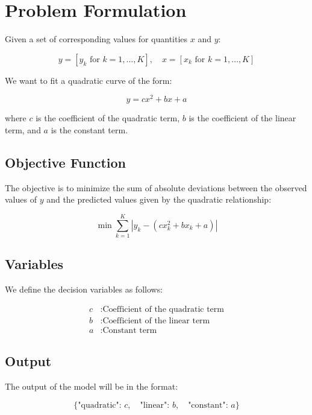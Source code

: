 \documentclass{article}
\begin{document}
\section*{Problem Formulation}

Given a set of corresponding values for quantities \( x \) and \( y \):

\[
y = [y_{k} \text{ for } k = 1,\ldots,K], \quad x = [x_{k} \text{ for } k = 1,\ldots,K]
\]

We want to fit a quadratic curve of the form:

\[
y = c x^2 + b x + a
\]

where \( c \) is the coefficient of the quadratic term, \( b \) is the coefficient of the linear term, and \( a \) is the constant term.

\subsection*{Objective Function}

The objective is to minimize the sum of absolute deviations between the observed values of \( y \) and the predicted values given by the quadratic relationship:

\[
\min \sum_{k=1}^{K} |y_{k} - (c x_{k}^2 + b x_{k} + a)|
\]

\subsection*{Variables}

We define the decision variables as follows:

\begin{align*}
c & : \text{Coefficient of the quadratic term} \\
b & : \text{Coefficient of the linear term} \\
a & : \text{Constant term}
\end{align*}

\subsection*{Output}

The output of the model will be in the format:

\[
\{ 
\text{"quadratic": } c, \quad 
\text{"linear": } b, \quad 
\text{"constant": } a 
\}
\]
\end{document}
